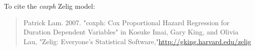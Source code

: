 To cite the \emph{ coxph } Zelig model:
 \begin{verse}
 Patrick Lam. 2007. "coxph: Cox Proportional Hazard Regression for Duration Dependent Variables" in Kosuke Imai, Gary King, and Olivia Lau, "Zelig: Everyone's Statistical Software,"\url{http://gking.harvard.edu/zelig} 
\end{verse}